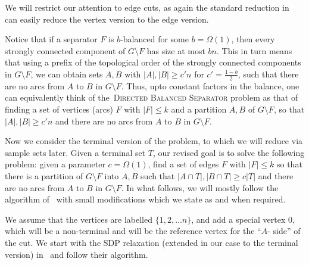 \documentclass[11pt]{article}
\newcommand{\DB}{{\textsc{Directed Balanced Separator}}}
\begin{document}
{We will restrict our attention to edge cuts, as again the standard reduction in~ can easily reduce the vertex version to the edge version.



Notice that if a separator $F$ is $b$-balanced for some $b = \Omega(1)$, then every strongly connected component of $G \setminus F$ has size at most $bn$. This in turn means that using a prefix of the topological order of the strongly connected components in $G \setminus F$, we can obtain sets $A,B$ with $|A|, |B| \geq c'n$ for  $c' = \frac{1-b}{2}$, such that there are no arcs from $A$ to $B$ in $G \setminus F$. Thus, upto constant factors in the balance, one can equivalently think of the~\DB{} problem as that of finding a set of vertices (arcs) $F$ with $|F| \leq k$ and a partition $A,B$ of $G \setminus F$, so that $|A|, |B| \geq c'n$ and there are no arcs from $A$ to $B$ in $G \setminus F$. 

Now we consider the terminal version of the problem, to which we will reduce via sample sets later. Given a terminal set $T$, our revised goal is to solve the following problem: given a parameter $c = \Omega(1)$, find a set of edges $F$ with $|F| \leq k$ so that there is a partition of $G \setminus F$ into $A, B$ such that $|A \cap T|, |B \cap T| \geq c|T|$ and there are no arcs from $A$ to $B$ in $G \setminus F$. In what follows, we will mostly follow the algorithm of~\cite{agarwal2005log} with small modifications which we state as and when required. 




We assume that the vertices are labelled $\{1,2, \ldots n\}$, and add a special vertex $0$, which will be a non-terminal and will be the reference vertex for the 
``$A$- side'' of the cut. We start with the SDP relaxation (extended in our case to the terminal version) in~\cite{agarwal2005log} and follow their algorithm.

\begin{center}
\noindent{}
\end{center}}
\end{document}
